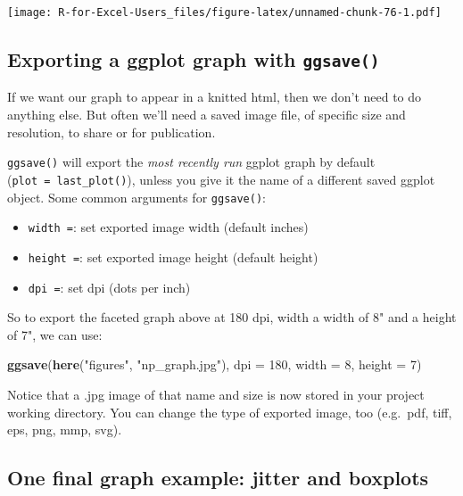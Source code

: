 \documentclass[]{book}
\newenvironment{Shaded}{\begin{snugshade}}{\end{snugshade}}
\newcommand{\DataTypeTok}[1]{\textcolor[rgb]{0.13,0.29,0.53}{#1}}
\newcommand{\DecValTok}[1]{\textcolor[rgb]{0.00,0.00,0.81}{#1}}
\newcommand{\KeywordTok}[1]{\textcolor[rgb]{0.13,0.29,0.53}{\textbf{#1}}}
\newcommand{\NormalTok}[1]{#1}
\newcommand{\StringTok}[1]{\textcolor[rgb]{0.31,0.60,0.02}{#1}}
\providecommand{\tightlist}{%
  \setlength{\itemsep}{0pt}\setlength{\parskip}{0pt}}
\begin{document}
\texttt{[image: R-for-Excel-Users\_files/figure-latex/unnamed-chunk-76-1.pdf]}

\hypertarget{exporting-a-ggplot-graph-with-ggsave}{%
\subsection{\texorpdfstring{Exporting a ggplot graph with \texttt{ggsave()}}{Exporting a ggplot graph with ggsave()}}\label{exporting-a-ggplot-graph-with-ggsave}}

If we want our graph to appear in a knitted html, then we don't need to do anything else. But often we'll need a saved image file, of specific size and resolution, to share or for publication.

\texttt{ggsave()} will export the \emph{most recently run} ggplot graph by default (\texttt{plot\ =\ last\_plot()}), unless you give it the name of a different saved ggplot object. Some common arguments for \texttt{ggsave()}:

\begin{itemize}
\tightlist
\item
  \texttt{width\ =}: set exported image width (default inches)
\item
  \texttt{height\ =}: set exported image height (default height)
\item
  \texttt{dpi\ =}: set dpi (dots per inch)
\end{itemize}

So to export the faceted graph above at 180 dpi, width a width of 8" and a height of 7", we can use:

\begin{Shaded}
\begin{Highlighting}[]
\KeywordTok{ggsave}\NormalTok{(}\KeywordTok{here}\NormalTok{(}\StringTok{"figures"}\NormalTok{, }\StringTok{"np_graph.jpg"}\NormalTok{), }\DataTypeTok{dpi =} \DecValTok{180}\NormalTok{, }\DataTypeTok{width =} \DecValTok{8}\NormalTok{, }\DataTypeTok{height =} \DecValTok{7}\NormalTok{)}
\end{Highlighting}
\end{Shaded}

Notice that a .jpg image of that name and size is now stored in your project working directory. You can change the type of exported image, too (e.g.~pdf, tiff, eps, png, mmp, svg).

\hypertarget{one-final-graph-example-jitter-and-boxplots}{%
\subsection{One final graph example: jitter and boxplots}\label{one-final-graph-example-jitter-and-boxplots}}
\end{document}
